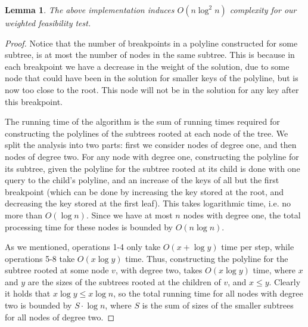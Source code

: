 \documentclass[11pt,a4paper]{article}
\newtheorem{lemma}{Lemma}
\theoremstyle{definition}
\theoremstyle{remark}
\begin{document}
\begin{lemma} \label{nlog^2n running time for weighted f.t. lemma}
The above implementation induces $O(n \log ^2 n)$ complexity for our weighted feasibility test.
\end{lemma}

\begin{proof}
Notice that the number of breakpoints in a polyline constructed for some subtree, is at most the number of nodes in the same subtree. This is because in each breakpoint we have a decrease in the weight of the solution, due to some node that could have been in the solution for smaller keys of the polyline, but is now too close to the root. This node will not be in the solution for any key after this breakpoint.

The running time of the algorithm is the sum of running times required for constructing the polylines of the subtrees rooted at each node of the tree. We split the analysis into two parts: first we consider nodes of degree one, and then nodes of degree two.
For any node with degree one, constructing the polyline for its subtree, given the polyline for the subtree rooted at its child is done with one query to the child's polyline, and an increase of the keys of all but the first breakpoint (which can be done by increasing the key stored at the root, and decreasing the key stored at the first leaf). This takes logarithmic time, i.e. no more than $O(\log n)$. Since we have at most $n$ nodes with degree one, the total processing time for these nodes is bounded by $O(n \log n)$.
 
As we mentioned, operations 1-4 only take $O(x+ \log y)$ time per step, while operations 5-8 take $O(x \log y)$ time.  Thus, constructing the polyline for the subtree rooted at some node $v$, with degree two, takes $O(x \log y)$ time, where $x$ and $y$ are the sizes of the subtrees rooted at the children of $v$, and $x \leq y$. Clearly it holds that $x \log y \leq x \log n$, so the total running time for all nodes with degree two is bounded by $S \cdot \log n$, where $S$ is the sum of sizes of the smaller subtrees for all nodes of degree two.


\end{proof}
\end{document}
